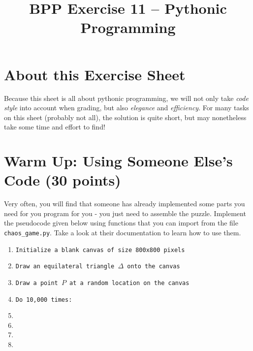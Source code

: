 

\title{BPP Exercise 11 -- Pythonic Programming}




\section*{About this Exercise Sheet}

Because this sheet is all about pythonic programming, we will not only take {\it code style} into account when grading, but also {\it elegance} and {\it efficiency}. For many tasks on this sheet (probably not all), the solution is quite short, but may nonetheless take some time and effort to find!


\section{Warm Up: Using Someone Else's Code (30 points)}

Very often, you will find that someone has already implemented some parts you need for you program for you - you just need to assemble the puzzle. Implement the pseudocode given below using functions that you can import from the file {\tt chaos\_game.py}. Take a look at their documentation to learn how to use them.

\vspace{1em}


\begin{enumerate}
    \item {\tt Initialize a blank canvas of size 800x800 pixels}
    \item {\tt Draw an equilateral triangle $\Delta$ onto the canvas}
    \item {\tt Draw a point $P$ at a random location on the canvas}
    \item {\tt Do 10,000 times:}
    \item \hspace{2em}{\tt Select a random corner $C$ of $\Delta$}
    \item \hspace{2em}{\tt Create a new point $P'$ that lies halfway between $C$ and $P$}
    \item \hspace{2em}{\tt Draw $P'$ onto the canvas}
    \item \hspace{2em}{\tt $P \leftarrow P'$}
\end{enumerate}

